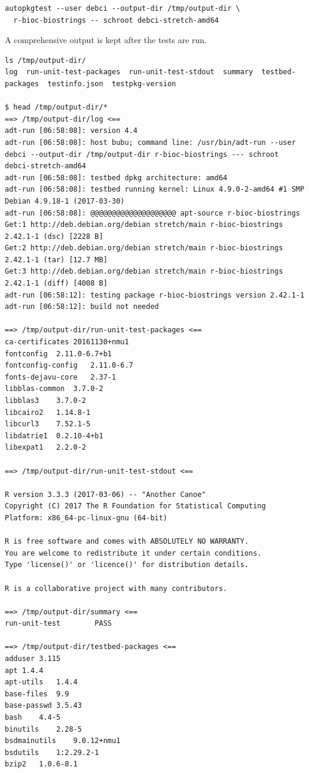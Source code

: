 \documentclass[mingoth,a4paper]{jsarticle}
\begin{document}
\begin{verbatim}
autopkgtest --user debci --output-dir /tmp/output-dir \
  r-bioc-biostrings -- schroot debci-stretch-amd64
\end{verbatim}

A comprehensive output is kept after the tests are run.

\begin{verbatim}
ls /tmp/output-dir/
log  run-unit-test-packages  run-unit-test-stdout  summary  testbed-packages  testinfo.json  testpkg-version

$ head /tmp/output-dir/*
==> /tmp/output-dir/log <==
adt-run [06:58:08]: version 4.4
adt-run [06:58:08]: host bubu; command line: /usr/bin/adt-run --user debci --output-dir /tmp/output-dir r-bioc-biostrings --- schroot debci-stretch-amd64
adt-run [06:58:08]: testbed dpkg architecture: amd64
adt-run [06:58:08]: testbed running kernel: Linux 4.9.0-2-amd64 #1 SMP Debian 4.9.18-1 (2017-03-30)
adt-run [06:58:08]: @@@@@@@@@@@@@@@@@@@@ apt-source r-bioc-biostrings
Get:1 http://deb.debian.org/debian stretch/main r-bioc-biostrings 2.42.1-1 (dsc) [2228 B]
Get:2 http://deb.debian.org/debian stretch/main r-bioc-biostrings 2.42.1-1 (tar) [12.7 MB]
Get:3 http://deb.debian.org/debian stretch/main r-bioc-biostrings 2.42.1-1 (diff) [4008 B]
adt-run [06:58:12]: testing package r-bioc-biostrings version 2.42.1-1
adt-run [06:58:12]: build not needed

==> /tmp/output-dir/run-unit-test-packages <==
ca-certificates 20161130+nmu1
fontconfig  2.11.0-6.7+b1
fontconfig-config   2.11.0-6.7
fonts-dejavu-core   2.37-1
libblas-common  3.7.0-2
libblas3    3.7.0-2
libcairo2   1.14.8-1
libcurl3    7.52.1-5
libdatrie1  0.2.10-4+b1
libexpat1   2.2.0-2

==> /tmp/output-dir/run-unit-test-stdout <==

R version 3.3.3 (2017-03-06) -- "Another Canoe"
Copyright (C) 2017 The R Foundation for Statistical Computing
Platform: x86_64-pc-linux-gnu (64-bit)

R is free software and comes with ABSOLUTELY NO WARRANTY.
You are welcome to redistribute it under certain conditions.
Type 'license()' or 'licence()' for distribution details.

R is a collaborative project with many contributors.

==> /tmp/output-dir/summary <==
run-unit-test        PASS

==> /tmp/output-dir/testbed-packages <==
adduser 3.115
apt 1.4.4
apt-utils   1.4.4
base-files  9.9
base-passwd 3.5.43
bash    4.4-5
binutils    2.28-5
bsdmainutils    9.0.12+nmu1
bsdutils    1:2.29.2-1
bzip2   1.0.6-8.1


\end{verbatim}
\end{document}
